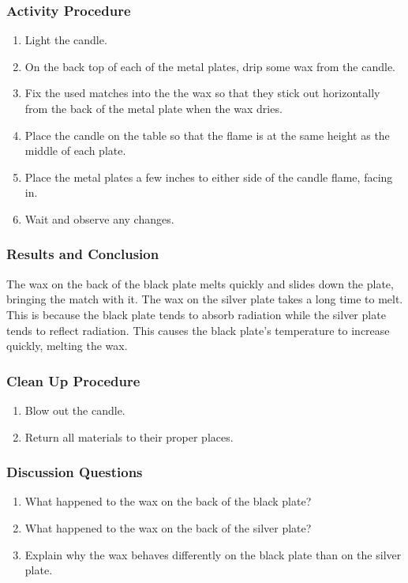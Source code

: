 \subsubsection*{Activity Procedure}
\begin{enumerate}
\item{Light the candle.}
\item{On the back top of each of the metal plates, drip some wax from the candle.}
\item{Fix the used matches into the the wax so that they stick out horizontally from the back of the metal plate when the wax dries.}
\item{Place the candle on the table so that the flame is at the same height as the middle of each plate.}
\item{Place the metal plates a few inches to either side of the candle flame, facing in.}
\item{Wait and observe any changes.}
\end{enumerate}

\subsubsection*{Results and Conclusion}
The wax on the back of the black plate melts quickly and slides down the plate, bringing the match with it.  The wax on the silver plate takes a long time to melt.  This is because the black plate tends to absorb radiation while the silver plate tends to reflect radiation.  This causes the black plate's temperature to increase quickly, melting the wax.

\subsubsection*{Clean Up Procedure}
\begin{enumerate}
\item{Blow out the candle.}
\item{Return all materials to their proper places.}
\end{enumerate}

\subsubsection*{Discussion Questions}
\begin{enumerate}
\item{What happened to the wax on the back of the black plate?}
\item{What happened to the wax on the back of the silver plate?}
\item{Explain why the wax behaves differently on the black plate than on the silver plate.}
\end{enumerate}

